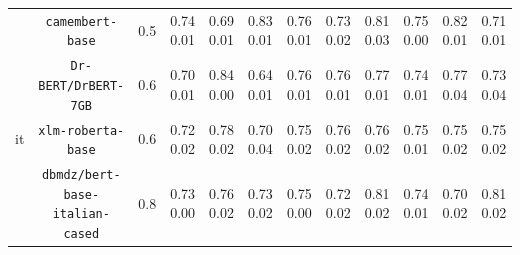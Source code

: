 \begin{tabular}{@{}cccccccccccc@{}}
&\verb|camembert-base|&0.5&0.74 \bm{$\pm$} 0.01&0.69 \bm{$\pm$} 0.01&0.83 \bm{$\pm$} 0.01&0.76 \bm{$\pm$} 0.01&0.73 \bm{$\pm$} 0.02&0.81 \bm{$\pm$} 0.03&0.75 \bm{$\pm$} 0.00&0.82 \bm{$\pm$} 0.01&0.71 \bm{$\pm$} 0.01\\%
&\verb|Dr-BERT/DrBERT-7GB|&0.6&0.70 \bm{$\pm$} 0.01&0.84 \bm{$\pm$} 0.00&0.64 \bm{$\pm$} 0.01&0.76 \bm{$\pm$} 0.01&0.76 \bm{$\pm$} 0.01&0.77 \bm{$\pm$} 0.01&0.74 \bm{$\pm$} 0.01&0.77 \bm{$\pm$} 0.04&0.73 \bm{$\pm$} 0.04\\%
\midrule%
it&\verb|xlm-roberta-base|&0.6&0.72 \bm{$\pm$} 0.02&0.78 \bm{$\pm$} 0.02&0.70 \bm{$\pm$} 0.04&0.75 \bm{$\pm$} 0.02&0.76 \bm{$\pm$} 0.02&0.76 \bm{$\pm$} 0.02&0.75 \bm{$\pm$} 0.01&0.75 \bm{$\pm$} 0.02&0.75 \bm{$\pm$} 0.02\\%
&\verb|dbmdz/bert-base-italian-cased|&0.8&0.73 \bm{$\pm$} 0.00&0.76 \bm{$\pm$} 0.02&0.73 \bm{$\pm$} 0.02&0.75 \bm{$\pm$} 0.00&0.72 \bm{$\pm$} 0.02&0.81 \bm{$\pm$} 0.02&0.74 \bm{$\pm$} 0.01&0.70 \bm{$\pm$} 0.02&0.81 \bm{$\pm$} 0.02\\\bottomrule%
%
\end{tabular}